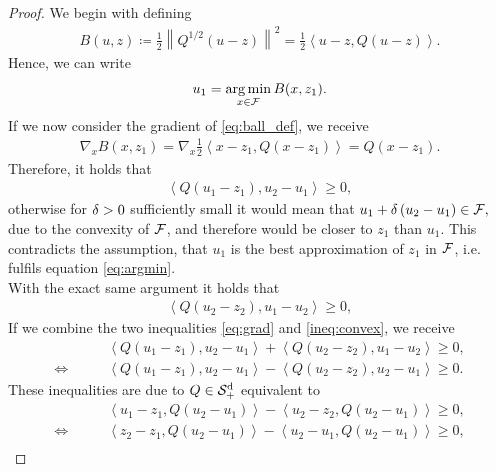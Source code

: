\begin{proof}
We begin with defining
\begin{align}\label{eq:ball_def}
B(u,z) \coloneqq \frac{1}{2} \left\| Q^{1/2} \left( u - z \right) \right\|^2 = \frac{1}{2} \left\langle u - z, Q\left( u - z \right) \right\rangle.
\end{align}
Hence, we can write
\begin{align}\label{eq:argmin}
u_1 = \operatorname*{arg\,min}_{x\in\operatorname{\mathcal{F}}} B(x, z_1).
\end{align}
If we now consider the gradient of \eqref{eq:ball_def}, we receive
\begin{align}\label{eq:grad}
\nabla_{x} B(x, z_1) = \nabla_{x} \frac{1}{2}\left\langle x - z_1, Q\left( x - z_1 \right) \right\rangle = Q \left( x - z_1 \right).
\end{align}
Therefore, it holds that
\begin{align}\label{ineq:convex}
\left\langle Q\left(u_1 - z_1 \right), u_2 - u_1 \right\rangle \geq 0,
\end{align}
otherwise for $\delta>0$ sufficiently small it would mean that $u_1 + \delta \left( u_2 - u_1 \right) \in \operatorname{\mathcal{F}},$ due to the convexity of $\operatorname{\mathcal{F}}$, and therefore would be closer to $z_1$ than $u_1$. This contradicts the assumption, that $u_1$ is the best approximation of $z_1$ in $\operatorname{\mathcal{F}}$, i.e. fulfils equation \eqref{eq:argmin}.\\
With the exact same argument it holds that
\begin{align*}
\left\langle Q\left(u_2 - z_2 \right), u_1 - u_2 \right\rangle \geq 0,
\end{align*}
If we combine the two inequalities \eqref{eq:grad} and \eqref{ineq:convex}, we receive
\begin{align*}
&\left\langle Q\left(u_1 - z_1 \right), u_2 - u_1 \right\rangle + \left\langle Q\left(u_2 - z_2 \right),  u_1 - u_2 \right\rangle \geq 0,\\
\Longleftrightarrow \qquad &\left\langle Q\left(u_1 - z_1 \right), u_2 - u_1 \right\rangle - \left\langle Q\left(u_2 - z_2 \right), u_2 - u_1 \right\rangle \geq 0.
\end{align*}
These inequalities are due to $Q\in\operatorname{\mathcal{S}^d_{+}}$ equivalent to
\begin{align*}
&\left\langle u_1 - z_1, Q \left( u_2 - u_1 \right) \right\rangle - \left\langle u_2 - z_2, Q\left( u_2 - u_1 \right) \right\rangle \geq 0,\\
\Longleftrightarrow \qquad &\left\langle z_2 - z_1, Q \left( u_2 - u_1 \right) \right\rangle - \left\langle u_2 - u_1, Q\left( u_2 - u_1 \right) \right\rangle \geq 0,\\

\end{align*}
\end{proof}
